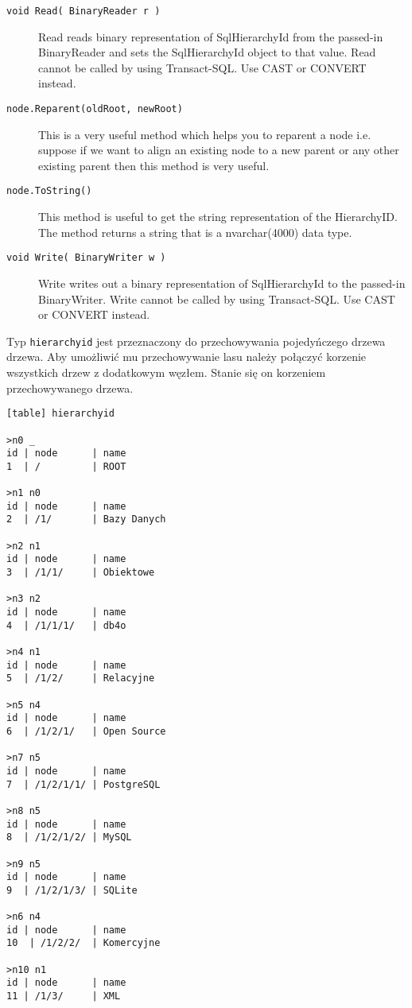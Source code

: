 \begin{description}
  \item[\texttt{void Read( BinaryReader r )}]
	Read reads binary representation of SqlHierarchyId from the passed-in BinaryReader and sets the SqlHierarchyId object to that value. 
	Read cannot be called by using Transact-SQL. Use CAST or CONVERT instead.

  \item[\texttt{node.Reparent(oldRoot, newRoot)}]
	This is a very useful method which helps you to reparent a node i.e. suppose if we want to align an existing node 
	to a new parent or any other existing parent then this method is very useful. 

  \item[\texttt{node.ToString()}]
	This method is useful to get the string representation of the HierarchyID. 
	The method returns a string that is a nvarchar(4000) data type.


  \item[\texttt{void Write( BinaryWriter w )}]
	Write writes out a binary representation of SqlHierarchyId to the passed-in BinaryWriter. 
	Write cannot be called by using Transact-SQL. Use CAST or CONVERT instead.

 \end{description}



Typ \texttt{hierarchyid} jest przeznaczony do przechowywania pojedyńczego drzewa drzewa.
Aby umożliwić mu przechowywanie lasu należy połączyć korzenie wszystkich drzew z dodatkowym węzłem.
Stanie się on korzeniem przechowywanego drzewa.

\begin{verbatim}[table] hierarchyid

>n0 _
id | node      | name
1  | /         | ROOT

>n1 n0
id | node      | name
2  | /1/       | Bazy Danych

>n2 n1
id | node      | name
3  | /1/1/     | Obiektowe

>n3 n2
id | node      | name
4  | /1/1/1/   | db4o

>n4 n1
id | node      | name
5  | /1/2/     | Relacyjne

>n5 n4
id | node      | name
6  | /1/2/1/   | Open Source

>n7 n5
id | node      | name
7  | /1/2/1/1/ | PostgreSQL

>n8 n5
id | node      | name
8  | /1/2/1/2/ | MySQL

>n9 n5
id | node      | name
9  | /1/2/1/3/ | SQLite

>n6 n4
id | node      | name
10  | /1/2/2/  | Komercyjne

>n10 n1
id | node      | name
11 | /1/3/     | XML

\end{verbatim}


